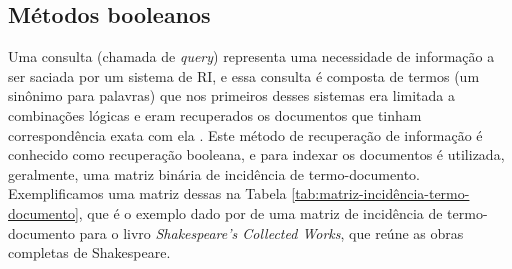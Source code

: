 \subsection{Métodos booleanos} \label{subsec:MétodosBooleanos}

    Uma consulta (chamada de \textit{query}) representa uma necessidade de informação a ser saciada por um sistema de RI, e essa consulta é composta de termos (um sinônimo para palavras) que nos primeiros desses sistemas era limitada a combinações lógicas e eram recuperados os documentos que tinham correspondência exata com ela \cite[p.~1446]{Sanderson2012THIRR}. 
    Este método de recuperação de informação é conhecido como recuperação booleana, e para indexar os documentos é utilizada, geralmente, uma matriz binária de incidência de termo-documento. 
    Exemplificamos uma matriz dessas na Tabela \ref{tab:matriz-incidência-termo-documento}, que é o exemplo dado por  de uma matriz de incidência de termo-documento para o livro \textit{Shakespeare’s Collected Works}, que reúne as obras completas de Shakespeare.

    

